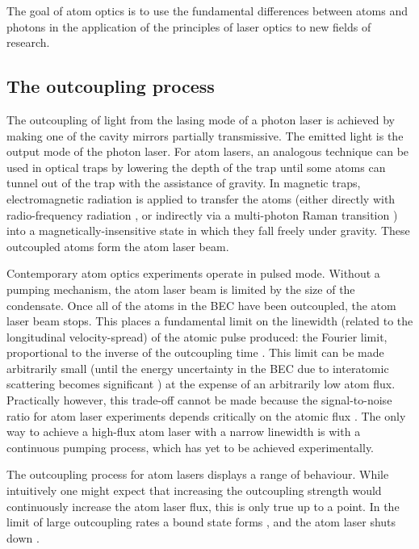 The goal of atom optics is to use the fundamental differences between atoms and photons in the application of the principles of laser optics to new fields of research.

\subsection{The outcoupling process}

The outcoupling of light from the lasing mode of a photon laser is achieved by making one of the cavity mirrors partially transmissive.  The emitted light is the output mode of the photon laser.  For atom lasers, an analogous technique can be used in optical traps by lowering the depth of the trap until some atoms can tunnel out of the trap with the assistance of gravity.  In magnetic traps, electromagnetic radiation is applied to transfer the atoms (either directly with radio-frequency radiation \citep{Mewes:1997,Bloch:1999mi}, or indirectly via a multi-photon Raman transition \citep{Moy:1997,Hagley:1999dz,Robins:2006fk}) into a magnetically-insensitive state in which they fall freely under gravity.  These outcoupled atoms form the atom laser beam.

Contemporary atom optics experiments operate in pulsed mode.  Without a pumping mechanism, the atom laser beam is limited by the size of the condensate.  Once all of the atoms in the BEC have been outcoupled, the atom laser beam stops.  This places a fundamental limit on the linewidth (related to the longitudinal velocity-spread) of the atomic pulse produced: the Fourier limit, proportional to the inverse of the outcoupling time \citep{Johnsson:2007}.  This limit can be made arbitrarily small (until the energy uncertainty in the BEC due to interatomic scattering becomes significant \cite{Johnsson:2007a}) at the expense of an arbitrarily low atom flux.  Practically however, this trade-off cannot be made because the signal-to-noise ratio for atom laser experiments depends critically on the atomic flux \citep{Dowling:1998}.  The only way to achieve a high-flux atom laser with a narrow linewidth is with a continuous pumping process, which has yet to be achieved experimentally. 

The outcoupling process for atom lasers displays a range of behaviour.  While intuitively one might expect that increasing the outcoupling strength would continuously increase the atom laser flux, this is only true up to a point.  In the limit of large outcoupling rates a bound state forms \citep{Jeffers:2000rr}, and the atom laser shuts down \citep{Robins:2004pz}.  

